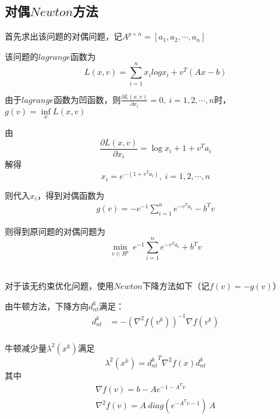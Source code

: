 \documentclass{article}
\begin{document}
\subsection{对偶$Newton$方法}
首先求出该问题的对偶问题，记$A^{p \times n}=[a_1,a_2,\dotsb,a_n]$

该问题的$lagrange$函数为
\begin{equation*}
    L(x,v)=\sum\limits_{i=1}^n x_i logx_i + v^T(Ax-b)
\end{equation*}

由于$lagrange$函数为凹函数，则$\frac{\partial L(x,v)}{\partial x_i}=0,\ i=1,2,\dotsb,n$时，$g(v)=\inf\limits_x L(x,v)$

由
\begin{equation*}
    \frac{\partial L(x,v)}{\partial x_i} = \log x_i +1+v^Ta_i
\end{equation*}
解得
\begin{equation*}
    x_i=e^{-(1+v^Ta_i)},\ i=1,2,\dotsb,n
\end{equation*}

则代入$x_i$，得到对偶函数为
\begin{align*}
    g(v)=-e^{-1}\sum\limits_{i=1}^n e^{-v^Ta_i}-b^Tv
\end{align*}

则得到原问题的对偶问题为
\begin{equation*}
    \min\limits_{v\in R^p}  \  e^{-1}\sum\limits_{i=1}^n e^{-v^Ta_i}+b^Tv
\end{equation*}
\\ \hspace*{\fill}

对于该无约束优化问题，使用$Newton$下降方法如下（记$f(v)=-g(v)$）

由牛顿方法，下降方向$d^k_{nt}$满足：
\begin{align*}
    d^k_{nt} & =-(\nabla^2 f(v^k))^{-1} \nabla f(v^k) \\
\end{align*}

牛顿减少量$\lambda^2(x^k)$满足
\begin{equation*}
    \lambda^2(x^k)={d^k_{nt}}^T \nabla^2 f(x) d^k_{nt}
\end{equation*}
其中
\begin{align*}
    \nabla f(v)=b-Ae^{-1-A^T v}\\
    \nabla^2 f(v)=A\ diag(e^{-A^Tv-1})\ A
\end{align*}
\\ \hspace*{\fill}
\end{document}
